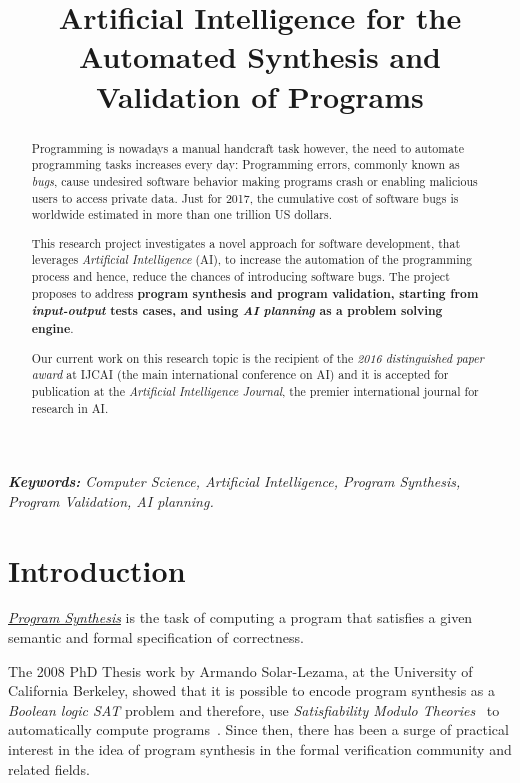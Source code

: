 \documentclass[10pt,a4paper]{paper}
\title{Artificial Intelligence for the Automated Synthesis and Validation of Programs}
\begin{document}
\maketitle

\begin{abstract}
  Programming is nowadays a manual handcraft task however, the need to automate programming tasks increases every day: Programming errors, commonly known as {\em bugs}, cause undesired software behavior making programs crash or enabling malicious users to access private data. Just for 2017, the cumulative cost of software bugs is worldwide estimated in more than one trillion US dollars. 

  This research project investigates a novel approach for software development, that leverages {\em Artificial Intelligence} (AI), to increase the automation of the programming process and hence, reduce the chances of introducing software bugs. The project proposes to address {\bf program synthesis and program validation, starting from {\em input-output} tests cases, and using {\em AI planning} as a problem solving engine}.

  Our current work on this research topic is the recipient of the {\em 2016 distinguished paper award} at {\sc IJCAI} (the main international conference on AI) and it is accepted for publication at the {\em Artificial Intelligence Journal}, the premier international journal for research in AI. 

\end{abstract}
{\em\scriptsize {\bf Keywords:} Computer Science, Artificial Intelligence, Program Synthesis, Program Validation, AI planning.}



\section{Introduction}
\label{sec:introduction}

{\underline{\em Program Synthesis}} is the task of computing a program that satisfies a given semantic and formal specification of correctness.

The 2008 PhD Thesis work by Armando Solar-Lezama, at the University of California Berkeley, showed that it is possible to encode program synthesis as a {\em Boolean logic SAT} problem and therefore, use {\em Satisfiability Modulo Theories}~\cite{barrett:SMT:2009} to automatically compute programs~\cite{lezama2008program}. Since then, there has been a surge of practical interest in the idea of program synthesis in the formal verification community and related fields.
\end{document}
